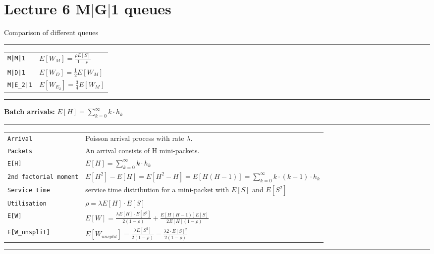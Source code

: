 \section{Lecture 6 M$|$G$|$1 queues}
Comparison of different queues
\hrule
\newlength{\MyLen}
\begin{tabular}{@{}p{\the\MyLen}@{}p{\linewidth-\the\MyLen}@{}}
\verb!M|M|1!	&  $E[W_M] = \frac{\rho E[S]}{1-\rho}$\\
\verb!M|D|1!	&  $E[W_D] = \frac{1}{2}E[W_M] $\\
\verb!M|E_2|1!	&  $E[W_{E_2}] = \frac{3}{4} E[W_M] $\\
\end{tabular}
\hrule

\textbf{Batch arrivals:} $E[H] = \sum_{k=0}^{\infty} k \cdot h_{k}$

\hrule
{}
\begin{tabular}{@{}p{\the\MyLen}@{}p{\linewidth-\the\MyLen}@{}}
\verb!Arrival!	&  Poisson arrival process with rate $\lambda$.\\
\verb!Packets!	&  An arrival consists of H mini-packets.\\
\verb!E[H]!	&  $E[H] = \sum_{k=0}^{\infty} k \cdot h_{k}$\\
\verb!2nd factorial moment!	&  $E[H^{2}] - E[H] = E[H^{2} - H] = E[H(H-1)]= \sum_{k=0}^{\infty} k \cdot (k-1) \cdot h_{k}$\\
\verb!Service time!	&  service time distribution for a mini-packet with $E[S]$ and $E[S^{2}]$\\
\verb!Utilisation!	&  $\rho = \lambda E[H] \cdot E[S]$\\
\verb!E[W]!	&  $E[W] = \frac{\lambda E[H] \cdot E[S^2]}{2(1-\rho)} + \frac{E[H(H-1)]E[S]}{2E[H](1-\rho)}$\\
\verb!E[W_unsplit]!	&  $E[W_{unsplit}] = \frac{\lambda E[S^{2}]}{2(1-\rho)} = \frac{\lambda 2 \cdot E[S]^{2}}{2(1-\rho)}$\\
\end{tabular}
\hrule

